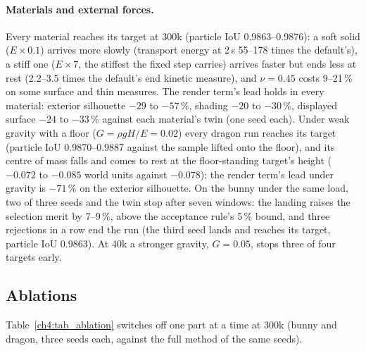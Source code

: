 \paragraph{Materials and external forces.} Every material reaches its target at 300k (particle IoU 0.9863--0.9876):
a soft solid ($E\times0.1$) arrives more slowly (transport energy at 2\,s 55--178 times the default's), a stiff one
($E\times7$, the stiffest the fixed step carries) arrives faster but ends less at rest (2.2--3.5 times the default's
end kinetic measure), and $\nu=0.45$ costs 9--21\,\% on some surface and thin measures. The render term's lead holds in every material: exterior silhouette
$-29$ to $-57$\,\%, shading $-20$ to $-30$\,\%, displayed surface $-24$ to $-33$\,\% against each material's twin (one
seed each). Under weak gravity with a floor ($G=\rho g H/E=0.02$) every dragon run reaches its target (particle IoU
0.9870--0.9887 against the sample lifted onto the floor), and its centre of mass falls and comes to rest at the
floor-standing target's height ($-0.072$ to $-0.085$ world units against $-0.078$); the render term's lead under gravity is
$-71$\,\% on the exterior silhouette. On the bunny under the same load, two of three seeds and the twin stop after seven
windows: the landing raises the selection merit by 7--9\,\%, above the acceptance rule's 5\,\% bound, and three
rejections in a row end the run (the third seed lands and reaches its target, particle IoU 0.9863). At 40k a stronger
gravity, $G=0.05$, stops three of four targets early.

\subsection{Ablations}
\label{ch4:sec_ablation}
Table~\ref{ch4:tab_ablation} switches off one part at a time at 300k (bunny and dragon, three seeds each, against the
full method of the same seeds).

